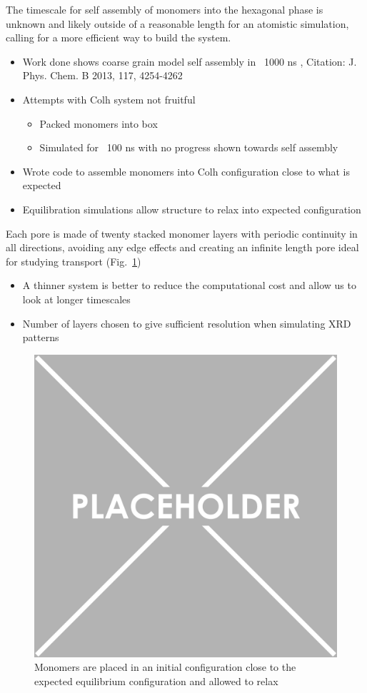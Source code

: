 \documentclass{article}
\begin{document}
	The timescale for self assembly of monomers into the hexagonal phase is unknown and likely outside of a reasonable length for an atomistic simulation, calling for a more efficient way to build the system. 
	\begin{itemize}
		\item Work done shows coarse grain model self assembly in ~1000 ns , Citation: J. Phys. Chem. B 2013, 117, 4254-4262
		\item Attempts with Colh system not fruitful  
		\begin{itemize}
			\item Packed monomers into box
			\item Simulated for ~100 ns with no progress shown towards self assembly
		\end{itemize}  
		\item Wrote code to assemble monomers into Colh configuration close to what is expected 
		\item Equilibration simulations allow structure to relax into expected configuration 
	\end{itemize}
	
	Each pore is made of twenty stacked monomer layers with periodic continuity in all directions, avoiding any edge effects and creating an infinite length pore ideal for studying transport (Fig.~\ref{fig:initial})
	\begin{itemize}
		\item A thinner system is better to reduce the computational cost and allow us to look at longer timescales
		\item Number of layers chosen to give sufficient resolution when simulating XRD patterns
	\end{itemize}

	\begin{figure}
	\includegraphics{placeholder.png}
		\caption{Monomers are placed in an initial configuration close to the expected equilibrium configuration and allowed to relax}
		\label{fig:initial}
	\end{figure}
\end{document}
